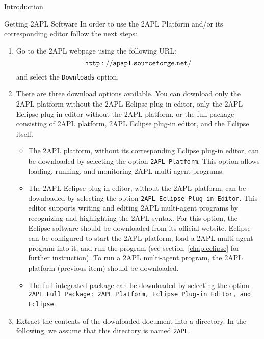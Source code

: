 \begin{chapter}{Introduction}
\begin{section}{Getting 2APL Software}
In order to use the 2APL Platform and/or its corresponding editor
follow the next steps:
\begin{enumerate}
    \item Go to the 2APL webpage using the following URL:
          $${\tt http://apapl.sourceforge.net/}$$
          and select the {\tt Downloads} option.

    \item There are three download options available. You can download
          only the 2APL platform without the 2APL Eclipse plug-in editor,
          only the 2APL Eclipse plug-in editor without the 2APL platform, or
          the full package consisting of 2APL platform, 2APL Eclipse plug-in editor,
          and the Eclipse itself.
          \begin{itemize}
                \item The 2APL platform, without its corresponding Eclipse plug-in
                editor, can be downloaded by selecting the option {\tt 2APL
                Platform}. This option allows loading, running, and
                monitoring 2APL multi-agent programs.
                \item The 2APL Eclipse plug-in editor, without the 2APL
                platform, can be downloaded by selecting the option
                {\tt 2APL Eclipse Plug-in Editor}. This editor
                supports writing and editing 2APL multi-agent programs by recognizing and highlighting the 2APL syntax.
                For this option, the Eclipse software should be downloaded from its official website.
                Eclipse can be configured to start the 2APL platform, load a 2APL multi-agent program into
                it, and run the program (see section~\ref{chap:eclipse} for further
                instruction). To run a 2APL multi-agent program, the
                2APL platform (previous item) should be downloaded.
                \item The full integrated package can be downloaded by
                selecting the option {\tt 2APL Full Package: 2APL Platform, Eclipse Plug-in Editor, and
                Eclipse}.
          \end{itemize}
    \item Extract the contents of the downloaded document into a
          directory. In the following, we assume that this directory is
          named {\tt 2APL}.
\end{enumerate}


\end{section}
\end{chapter}
